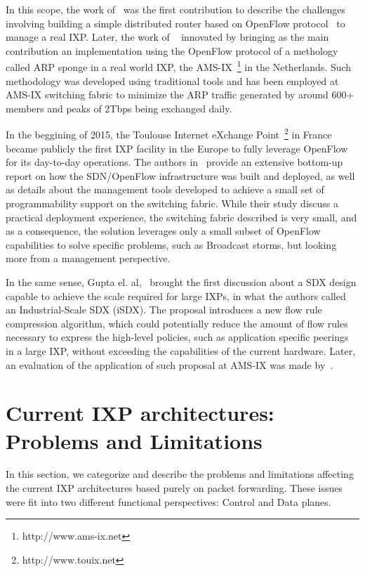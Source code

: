\documentclass[conference]{IEEEtran/IEEEtran}
\begin{document}
In this scope, the work of~\cite{stringer2013cardigan} was the first contribution to describe the challenges involving building a simple distributed router based on OpenFlow protocol~\cite{nascimento2011virtual} to manage a real IXP. Later, the work of ~\cite{ams2013victor} innovated by bringing as the main contribution an implementation using the OpenFlow protocol of a methology called ARP sponge in a real world IXP, the AMS-IX~\footnote{http://www.ams-ix.net} in the Netherlands. Such methodology was developed using traditional tools and has been employed at AMS-IX switching fabric to minimize the ARP traffic generated by around 600+ members and peaks of 2Tbps being exchanged daily. 

In the beggining of 2015, the Toulouse Internet eXchange Point~\footnote{http://www.touix.net} in France became publicly the first IXP facility in the Europe to fully leverage OpenFlow for its day-to-day operations. The authors in~\cite{lapeyrade2016openflow} provide an extensive bottom-up report on how the SDN/OpenFlow infrastructure was built and deployed, as well as details about the management tools developed to achieve a small set of programmability support on the switching fabric. While their study discuss a practical deployment experience, the switching fabric described is very small, and as a consequence, the solution leverages only a small subset of OpenFlow capabilities to solve specific problems, such as Broadcast storms, but looking more from a management perspective.
 
In the same sense, Gupta el. al,~\cite{gupta2016industrial} brought the first discussion about a SDX design capable to achieve the scale required for large IXPs, in what the authors called an Industrial-Scale SDX (iSDX). The proposal introduces a new flow rule compression algorithm, which could potentially reduce the amount of flow rules necessary to express the high-level policies, such as application specific peerings in a large IXP, without exceeding the capabilities of the current hardware. Later, an evaluation of the application of such proposal at AMS-IX was made by~\cite{hermansfeasibility}.

\section{Current IXP architectures: Problems and Limitations}
\label{current_ixp}
In this section, we categorize and describe the problems and limitations affecting the current IXP architectures based purely on packet forwarding. These issues were fit into two different functional perspectives: Control and Data planes. 
\end{document}
